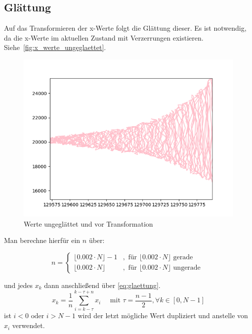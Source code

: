 \subsection{Glättung}\label{subsec:gleattung}
Auf das Transformieren der x-Werte folgt die Glättung dieser.
Es ist notwendig, da die x-Werte im aktuellen Zustand mit Verzerrungen existieren.
Siehe~\autoref{fig:x_werte_ungeglaettet}.

\begin{figure}[htb]
    \centering
    \includegraphics[scale=0.62]{images/Werte_unglatt}
    \caption{Werte ungeglättet und vor Transformation}
    \label{fig:x_werte_ungeglaettet}
\end{figure}

Man berechne hierfür ein $n$ über:

\begin{equation}
    n= \begin{cases}
           \lfloor 0.002 \cdot N\rfloor-1 & , \text { für }\lfloor 0.002 \cdot N\rfloor \text { gerade } \\ \lfloor 0.002 \cdot N\rfloor & , \text { für }\lfloor 0.002 \cdot N\rfloor \text { ungerade }
    \end{cases}\label{eq:auswahl n}
\end{equation}

und jedes $x_k$ dann anschließend über \autoref{eq:glaettung}.
\begin{equation}
    x_{k}=\frac{1}{n} \sum_{i=k-\tau}^{k-\tau+n} \hat{x}_{i} \quad \text { mit } \tau=\frac{n-1}{2}, \forall k \in[0, N-1]\label{eq:glaettung}
\end{equation}
ist $i<0 \text{ oder } i>N-1$ wird der letzt mögliche Wert dupliziert und anstelle von $\hat{x}_{i}$ verwendet.

